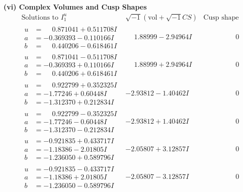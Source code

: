 \documentclass[1p]{elsarticle_modified}
\theoremstyle{definition}
\newcommand{\I}{\sqrt{-1}}
\begin{document}
\newpage\flushleft \textbf{(vi) Complex Volumes and Cusp Shapes}
$$\begin{array}{c|c|c}  
\text{Solutions to }I^u_{1}& \I (\text{vol} + \sqrt{-1}CS) & \text{Cusp shape}\\
 \hline 
\begin{aligned}
u &= \phantom{-}0.871041 + 0.511708 I \\
a &= -0.369393 - 0.110166 I \\
b &= \phantom{-}0.440206 - 0.618461 I\end{aligned}
 & \phantom{-}1.88999 - 2.94964 I & \phantom{-0.000000 } 0 \\ \hline\begin{aligned}
u &= \phantom{-}0.871041 - 0.511708 I \\
a &= -0.369393 + 0.110166 I \\
b &= \phantom{-}0.440206 + 0.618461 I\end{aligned}
 & \phantom{-}1.88999 + 2.94964 I & \phantom{-0.000000 } 0 \\ \hline\begin{aligned}
u &= \phantom{-}0.922799 + 0.352325 I \\
a &= -1.77246 + 0.60448 I \\
b &= -1.312370 + 0.212834 I\end{aligned}
 & -2.93812 - 1.40462 I & \phantom{-0.000000 } 0 \\ \hline\begin{aligned}
u &= \phantom{-}0.922799 - 0.352325 I \\
a &= -1.77246 - 0.60448 I \\
b &= -1.312370 - 0.212834 I\end{aligned}
 & -2.93812 + 1.40462 I & \phantom{-0.000000 } 0 \\ \hline\begin{aligned}
u &= -0.921835 + 0.433717 I \\
a &= -1.18386 - 2.01805 I \\
b &= -1.236050 + 0.589796 I\end{aligned}
 & -2.05807 + 3.12857 I & \phantom{-0.000000 } 0 \\ \hline\begin{aligned}
u &= -0.921835 - 0.433717 I \\
a &= -1.18386 + 2.01805 I \\
b &= -1.236050 - 0.589796 I\end{aligned}
 & -2.05807 - 3.12857 I & \phantom{-0.000000 } 0 \\ \hline\begin{aligned}

\end{aligned}
\end{array}$$
\end{document}

